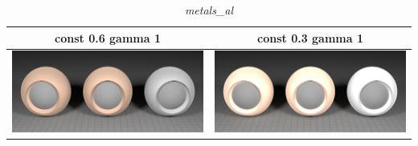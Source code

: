 \documentclass[11pt]{article}
\begin{document}
\begin{table}[ht]
  \centering
  \begin{tabular}{ | c | c | }
    \hline
    const 0.6 gamma 1 & const 0.3 gamma 1 \\ \hline
    \begin{minipage}{.3\textwidth}
      \includegraphics[scale=0.1]{img/obj/metals_al/metals_al_disney_dc03_dg1.jpg}
    \end{minipage}
    &
    \begin{minipage}{.3\textwidth}
      \includegraphics[scale=0.1]{img/obj/metals_al/metals_al_disney_dg1.jpg}
    \end{minipage}
    \\ \hline
  \end{tabular}
  \caption{\textit{metals\_al}}\label{tbl:myLboro}
\end{table}
\end{document}

